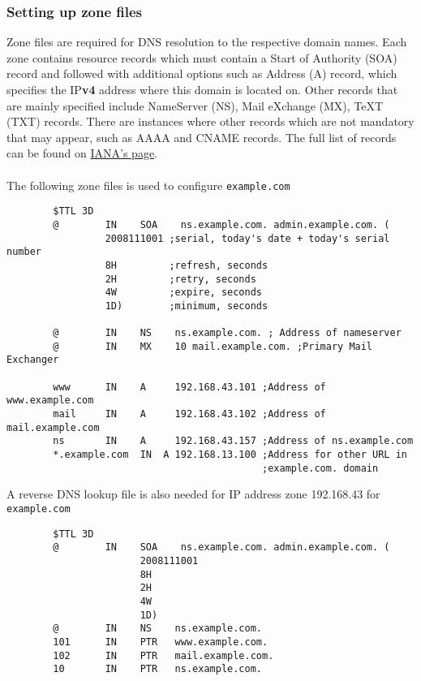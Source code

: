 \documentclass[a4paper,12pt]{article}
\begin{document}
		\subsubsection{Setting up zone files}
		\begin{par}
		Zone files are required for DNS resolution to the respective domain names. Each zone  contains resource records which must contain a Start of Authority (SOA) record and followed with additional options such as Address (A) record, which specifies the IP\textbf{v4} address where this domain is located on. Other records that are mainly specified include NameServer (NS), Mail eXchange (MX), TeXT (TXT) records. There are instances where other records which are not mandatory that may appear, such as AAAA and CNAME records. The full list of records can be found on \href{https://www.iana.org/assignments/dns-parameters/dns-parameters.xhtml}{IANA's page}.\\\\The following zone files is used to configure \texttt{example.com}
		\end{par}
		\begin{verbatim}
		$TTL 3D
		@        IN    SOA    ns.example.com. admin.example.com. (
		         2008111001 ;serial, today's date + today's serial number
		         8H         ;refresh, seconds
		         2H         ;retry, seconds
		         4W         ;expire, seconds
		         1D)        ;minimum, seconds
		
		@        IN    NS    ns.example.com. ; Address of nameserver
		@        IN    MX    10 mail.example.com. ;Primary Mail Exchanger
		
		www      IN    A     192.168.43.101 ;Address of www.example.com
		mail     IN    A     192.168.43.102 ;Address of mail.example.com
		ns       IN    A     192.168.43.157 ;Address of ns.example.com
		*.example.com  IN  A 192.168.13.100 ;Address for other URL in 
		                                    ;example.com. domain
		\end{verbatim}
		A reverse DNS lookup file is also needed for IP address zone 192.168.43 for \texttt{example.com}
		\begin{verbatim}
		$TTL 3D
		@        IN    SOA    ns.example.com. admin.example.com. (
		               2008111001
		               8H
		               2H
		               4W
		               1D)
		@        IN    NS    ns.example.com.
		101      IN    PTR   www.example.com.
		102      IN    PTR   mail.example.com.
		10       IN    PTR   ns.example.com.
		\end{verbatim}
\end{document}
